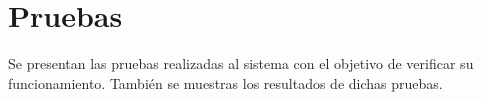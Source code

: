\chapter{Pruebas}

Se presentan las pruebas realizadas al sistema con el objetivo de verificar su funcionamiento.
También se muestras los resultados de dichas pruebas.


